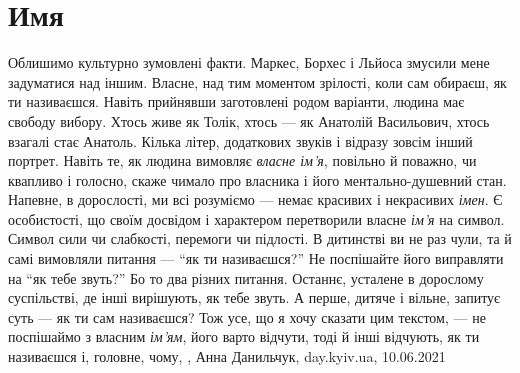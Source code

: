  
 
 
 
 
\chapter{Имя}
\label{sec:slova.imja}

Облишимо культурно зумовлені факти. Маркес, Борхес і Льйоса змусили мене
задуматися над іншим. Власне, над тим моментом зрілості, коли сам обираєш, як
ти називаєшся. Навіть прийнявши заготовлені родом варіанти, людина має свободу
вибору. Хтось живе як Толік, хтось — як Анатолій Васильович, хтось взагалі стає
Анатоль. Кілька літер, додаткових звуків і відразу зовсім інший портрет. Навіть
те, як людина вимовляє \emph{власне ім'я}, повільно й поважно, чи квапливо і голосно,
скаже чимало про власника і його ментально-душевний стан.  Напевне, в
дорослості, ми всі розуміємо — немає красивих і некрасивих \emph{імен}. Є особистості,
що своїм досвідом і характером перетворили власне \emph{ім’я} на символ. Символ сили
чи слабкості, перемоги чи підлості.  В дитинстві ви не раз чули, та й самі
вимовляли питання — \enquote{як ти називаєшся?} Не поспішайте його виправляти на \enquote{як
тебе звуть?} Бо то два різних питання. Останнє, усталене в дорослому
суспільстві, де інші вирішують, як тебе звуть. А перше, дитяче і вільне,
запитує суть — як ти сам називаєшся?  Тож усе, що я хочу сказати цим текстом, —
не поспішаймо з власним \emph{ім’ям},  його варто відчути, тоді й інші відчують, як ти
називаєшся і, головне, чому,
, Анна Данильчук, day.kyiv.ua, 10.06.2021

